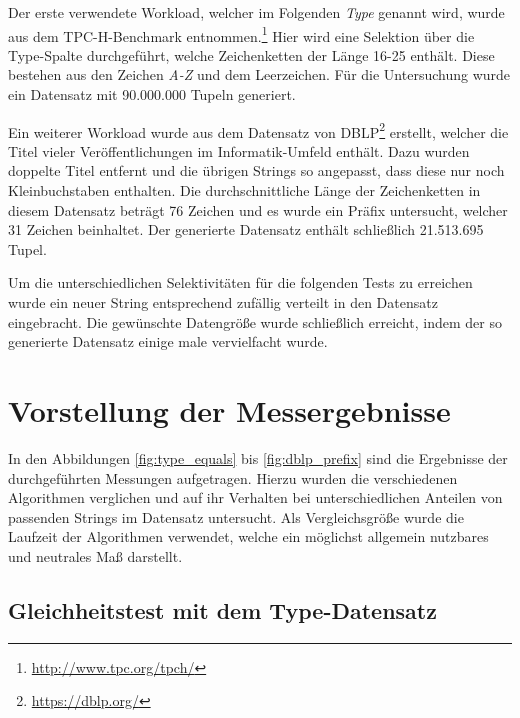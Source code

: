 Der erste verwendete Workload, welcher im Folgenden \emph{Type} genannt wird, wurde aus dem TPC-H-Benchmark entnommen.\footnote{\url{http://www.tpc.org/tpch/}}
Hier wird eine Selektion über die Type-Spalte durchgeführt, welche Zeichenketten der Länge 16-25 enthält.
Diese bestehen aus den Zeichen \emph{A-Z} und dem Leerzeichen.
Für die Untersuchung wurde ein Datensatz mit 90.000.000 Tupeln generiert.

Ein weiterer Workload wurde aus dem Datensatz von DBLP\footnote{\url{https://dblp.org/}} erstellt, welcher die Titel vieler Veröffentlichungen im Informatik-Umfeld enthält.
Dazu wurden doppelte Titel entfernt und die übrigen Strings so angepasst, dass diese nur noch Kleinbuchstaben enthalten.
Die durchschnittliche Länge der Zeichenketten in diesem Datensatz beträgt 76 Zeichen und es wurde ein Präfix untersucht, welcher 31 Zeichen beinhaltet.
Der generierte Datensatz enthält schließlich 21.513.695 Tupel.

Um die unterschiedlichen Selektivitäten für die folgenden Tests zu erreichen wurde ein neuer String entsprechend zufällig verteilt in den Datensatz eingebracht.
Die gewünschte Datengröße wurde schließlich erreicht, indem der so generierte Datensatz einige male vervielfacht wurde.

\section{Vorstellung der Messergebnisse}

In den Abbildungen \ref{fig:type_equals} bis \ref{fig:dblp_prefix} sind die Ergebnisse der durchgeführten Messungen aufgetragen.
Hierzu wurden die verschiedenen Algorithmen verglichen und auf ihr Verhalten bei unterschiedlichen Anteilen von passenden Strings im Datensatz untersucht.
Als Vergleichsgröße wurde die Laufzeit der Algorithmen verwendet, welche ein möglichst allgemein nutzbares und neutrales Maß darstellt.

\subsection{Gleichheitstest mit dem Type-Datensatz}

